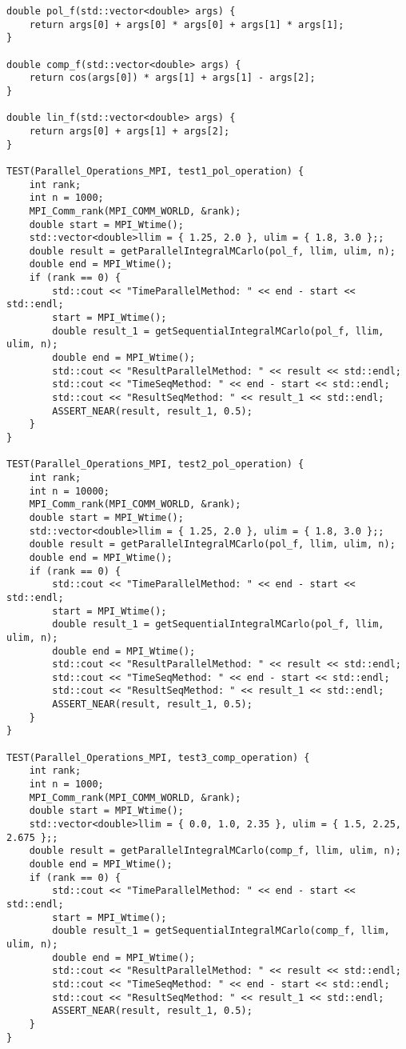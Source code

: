 \documentclass{report}
\begin{document}
\begin{lstlisting}
double pol_f(std::vector<double> args) {
    return args[0] + args[0] * args[0] + args[1] * args[1];
}

double comp_f(std::vector<double> args) {
    return cos(args[0]) * args[1] + args[1] - args[2];
}

double lin_f(std::vector<double> args) {
    return args[0] + args[1] + args[2];
}

TEST(Parallel_Operations_MPI, test1_pol_operation) {
    int rank;
    int n = 1000;
    MPI_Comm_rank(MPI_COMM_WORLD, &rank);
    double start = MPI_Wtime();
    std::vector<double>llim = { 1.25, 2.0 }, ulim = { 1.8, 3.0 };;
    double result = getParallelIntegralMCarlo(pol_f, llim, ulim, n);
    double end = MPI_Wtime();
    if (rank == 0) {
        std::cout << "TimeParallelMethod: " << end - start << std::endl;
        start = MPI_Wtime();
        double result_1 = getSequentialIntegralMCarlo(pol_f, llim, ulim, n);
        double end = MPI_Wtime();
        std::cout << "ResultParallelMethod: " << result << std::endl;
        std::cout << "TimeSeqMethod: " << end - start << std::endl;
        std::cout << "ResultSeqMethod: " << result_1 << std::endl;
        ASSERT_NEAR(result, result_1, 0.5);
    }
}

TEST(Parallel_Operations_MPI, test2_pol_operation) {
    int rank;
    int n = 10000;
    MPI_Comm_rank(MPI_COMM_WORLD, &rank);
    double start = MPI_Wtime();
    std::vector<double>llim = { 1.25, 2.0 }, ulim = { 1.8, 3.0 };;
    double result = getParallelIntegralMCarlo(pol_f, llim, ulim, n);
    double end = MPI_Wtime();
    if (rank == 0) {
        std::cout << "TimeParallelMethod: " << end - start << std::endl;
        start = MPI_Wtime();
        double result_1 = getSequentialIntegralMCarlo(pol_f, llim, ulim, n);
        double end = MPI_Wtime();
        std::cout << "ResultParallelMethod: " << result << std::endl;
        std::cout << "TimeSeqMethod: " << end - start << std::endl;
        std::cout << "ResultSeqMethod: " << result_1 << std::endl;
        ASSERT_NEAR(result, result_1, 0.5);
    }
}

TEST(Parallel_Operations_MPI, test3_comp_operation) {
    int rank;
    int n = 1000;
    MPI_Comm_rank(MPI_COMM_WORLD, &rank);
    double start = MPI_Wtime();
    std::vector<double>llim = { 0.0, 1.0, 2.35 }, ulim = { 1.5, 2.25, 2.675 };;
    double result = getParallelIntegralMCarlo(comp_f, llim, ulim, n);
    double end = MPI_Wtime();
    if (rank == 0) {
        std::cout << "TimeParallelMethod: " << end - start << std::endl;
        start = MPI_Wtime();
        double result_1 = getSequentialIntegralMCarlo(comp_f, llim, ulim, n);
        double end = MPI_Wtime();
        std::cout << "ResultParallelMethod: " << result << std::endl;
        std::cout << "TimeSeqMethod: " << end - start << std::endl;
        std::cout << "ResultSeqMethod: " << result_1 << std::endl;
        ASSERT_NEAR(result, result_1, 0.5);
    }
}


\end{lstlisting}
\end{document}
